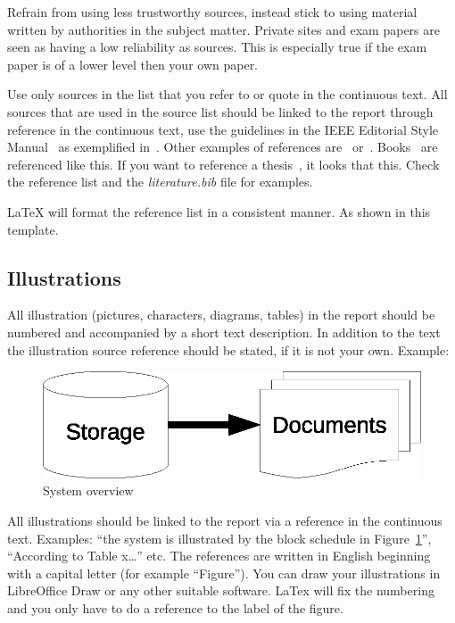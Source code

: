 Refrain from using less trustworthy sources, instead stick to using material
written by authorities in the subject matter. Private sites and exam papers are
seen as having a low reliability as sources. This is especially true if the exam
paper is of a lower level then your own paper.

Use only sources in the list that you refer to or quote in the continuous text.
All sources that are used in the source list should be linked to the report
through reference in the continuous text, use the guidelines in the  IEEE
Editorial Style Manual~\cite{ieeestylemanual} as exemplified
in~\cite{ieeesunipit}. Other examples of references
are~\cite{eriksson2001dynamic} or~\cite{lavassani2018combining}.
Books~\cite{brookshear2008computer} are referenced like this. If you want to
reference a thesis~\cite{forsstrom2014enabling}, it looks that this. Check the
reference list and the \emph{literature.bib} file for examples.

LaTeX will format the reference list in a consistent manner. As shown in this template.

\subsection{Illustrations}\label{subsec:illustrations}
All illustration (pictures, characters, diagrams, tables) in the report should
be numbered and accompanied by a short text description. In addition to the text
the illustration source reference should be stated, if it is not your own.
Example:
\begin{figure}[ht]
    \centering
    \includegraphics{Pictures/Latex_figure1.eps}
    \caption{System overview}\label{fig:figure1}
\end{figure}

All illustrations should be linked to the report via a reference in the
continuous text. Examples: ``the system is illustrated by the block schedule in
Figure~\ref{fig:figure1}'', ``According to Table x\dots'' etc. The references are
written in English beginning with a capital letter (for example ``Figure''). You
can draw your illustrations in LibreOffice Draw or any other suitable software.
LaTex will fix the numbering and you only have to do a reference to the label of
the figure.

